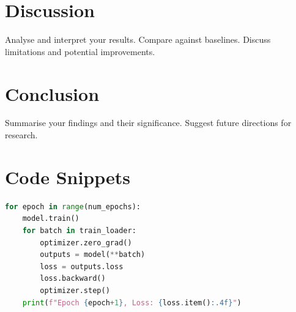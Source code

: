 \documentclass[12pt, a4paper]{article}
\begin{document}
\section{Discussion}
\label{sec:discussion}

Analyse and interpret your results. Compare against baselines.
Discuss limitations and potential improvements.

\section{Conclusion}
\label{sec:conclusion}

Summarise your findings and their significance. Suggest future
directions for research.

\appendix
\section{Code Snippets}

\begin{lstlisting}[language=Python, caption={Example training loop.}]
for epoch in range(num_epochs):
    model.train()
    for batch in train_loader:
        optimizer.zero_grad()
        outputs = model(**batch)
        loss = outputs.loss
        loss.backward()
        optimizer.step()
    print(f"Epoch {epoch+1}, Loss: {loss.item():.4f}")
\end{lstlisting}




\end{document}
